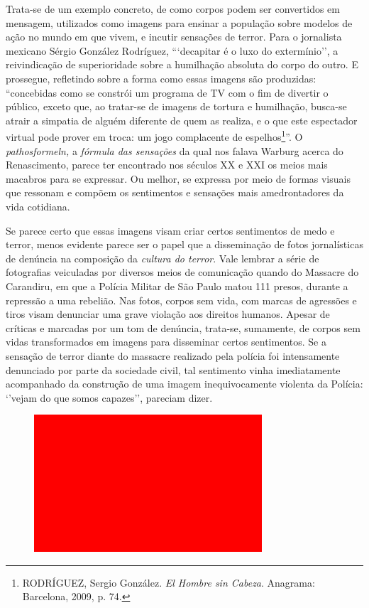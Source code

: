 Trata-se de um exemplo concreto, de como corpos podem ser convertidos em
mensagem, utilizados como imagens para ensinar a população sobre modelos
de ação no mundo em que vivem, e incutir sensações de terror. Para o
jornalista mexicano Sérgio González Rodríguez, ```decapitar é o luxo do
extermínio'', a reivindicação de superioridade sobre a humilhação
absoluta do corpo do outro. E prossegue, refletindo sobre a forma como
essas imagens são produzidas: ``concebidas como se constrói um programa
de TV com o fim de divertir o público, exceto que, ao tratar-se de
imagens de tortura e humilhação, busca-se atrair a simpatia de alguém
diferente de quem as realiza, e o que este espectador virtual pode
prover em troca: um jogo complacente de espelhos\footnote{RODRÍGUEZ,
  Sergio González. \emph{El Hombre sin Cabeza}. Anagrama: Barcelona,
  2009, p. 74.}''. O \emph{pathosformeln,} a \emph{fórmula das
sensações} da qual nos falava Warburg acerca do Renascimento, parece ter
encontrado nos séculos XX e XXI os meios mais macabros para se
expressar. Ou melhor, se expressa por meio de formas visuais que
ressonam e compõem os sentimentos e sensações mais amedrontadores da
vida cotidiana.

Se parece certo que essas imagens visam criar certos sentimentos de medo
e terror, menos evidente parece ser o papel que a disseminação de fotos
jornalísticas de denúncia na composição da \emph{cultura do terror}.
Vale lembrar a série de fotografias veiculadas por diversos meios de
comunicação quando do Massacre do Carandiru, em que a Polícia Militar de
São Paulo matou 111 presos, durante a repressão a uma rebelião. Nas
fotos, corpos sem vida, com marcas de agressões e tiros visam denunciar
uma grave violação aos direitos humanos. Apesar de críticas e marcadas
por um tom de denúncia, trata-se, sumamente, de corpos sem vidas
transformados em imagens para disseminar certos sentimentos. Se a
sensação de terror diante do massacre realizado pela polícia foi
intensamente denunciado por parte da sociedade civil, tal sentimento
vinha imediatamente acompanhado da construção de uma imagem
inequivocamente violenta da Polícia: `'vejam do que somos capazes'',
pareciam dizer.

\begin{figure}[!ht]
\centering
 \includegraphics[width=85mm]{./imgs/im1.jpg}
\caption{\footnotesize{}}
\end{figure}


